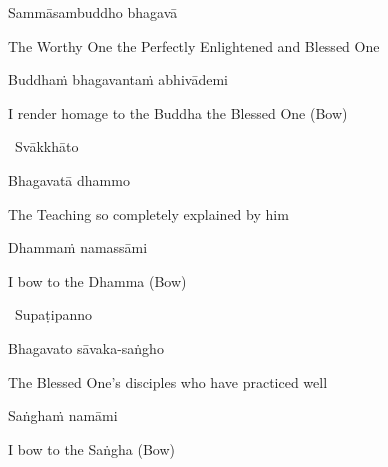 \vspace{-0.5cm}

Sammāsambuddho bhagavā

\begin{english}
  The Worthy One the Perfectly Enlightened and Blessed One
\end{english}

Buddhaṁ bhagavantaṁ abhivādemi\relax

\begin{english}
  I render homage to the Buddha the Blessed One \hfill{\textnormal{\ifafiveversion\fontsize{12.5}{18}\fi\ifasixversion\fontsize{9}{13}\fi\selectfont (Bow)}}
\end{english}

\begin{leader}
  \anglebracketleft\ \hspace{-0.5mm}Svākkhāto \hspace{-0.5mm}\anglebracketright\
\end{leader}

\vspace{-0.5cm}

Bhagavatā dhammo

\begin{english}
  The Teaching so completely explained by him
\end{english}

Dhammaṁ namassāmi\relax

\begin{english}
  I bow to the Dhamma \hfill{\textnormal{\ifafiveversion\fontsize{12.5}{18}\fi\ifasixversion\fontsize{9}{13}\fi\selectfont (Bow)}}
\end{english}

\begin{leader}
  \anglebracketleft\ \hspace{-0.5mm}Supaṭipanno \hspace{-0.5mm}\anglebracketright\
\end{leader}

\vspace{-0.5cm}

Bhagavato sāvaka-saṅgho

\begin{english}
  The Blessed One's disciples who have practiced well
\end{english}

Saṅghaṁ namāmi

\begin{english}
  I bow to the Saṅgha \hfill{\textnormal{\ifafiveversion\fontsize{12.5}{18}\fi\ifasixversion\fontsize{9}{13}\fi\selectfont (Bow)}}
\end{english}

